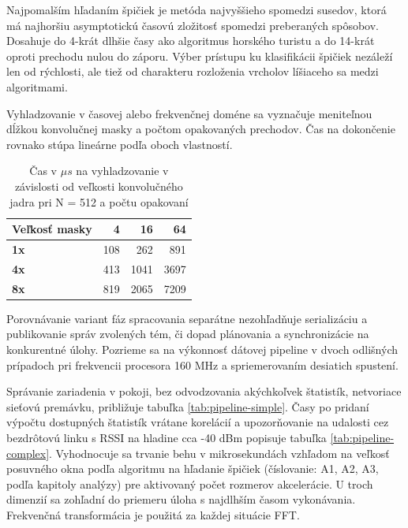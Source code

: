 Najpomalším hľadaním špičiek je metóda najvyššieho spomedzi susedov, ktorá má najhoršiu asymptotickú časovú zložitosť
spomedzi preberaných spôsobov. Dosahuje do 4-krát dlhšie časy ako algoritmus horského turistu a do 14-krát oproti prechodu
nulou do záporu. Výber prístupu ku klasifikácii špičiek nezáleží len od rýchlosti, ale tiež od charakteru rozloženia
vrcholov líšiaceho sa medzi algoritmami.

Vyhladzovanie v časovej alebo frekvenčnej doméne sa vyznačuje meniteľnou dĺžkou konvolučnej masky a počtom opakovaných
prechodov. Čas na dokončenie rovnako stúpa lineárne podľa oboch vlastností.
\begin{table}[h]
\def\arraystretch{1.25}
\centering
\begin{tabular}{|l|r|r|r|}
\hline
\textbf{Veľkosť masky}  & \textbf{4} & \textbf{16} & \textbf{64} \\ \hline
\textbf{1x} & 108        & 262         & 891         \\ \hline
\textbf{4x} & 413        & 1041        & 3697        \\ \hline
\textbf{8x} & 819        & 2065        & 7209        \\ \hline
\end{tabular}
\caption{Čas v $\mu s$ na vyhladzovanie v závislosti od veľkosti konvolučného jadra pri N = 512 a počtu opakovaní}
\label{tab:kernel-execution}
\end{table}

Porovnávanie variant fáz spracovania separátne nezohľadňuje serializáciu a publikovanie správ zvolených tém, či
dopad plánovania a synchronizácie na konkurentné úlohy. Pozrieme sa na výkonnosť dátovej pipeline v dvoch odlišných prípadoch
pri frekvencii procesora 160 MHz a spriemerovaním desiatich spustení.

Správanie zariadenia v pokoji, bez odvodzovania akýchkoľvek štatistík, netvoriace sieťovú premávku, približuje tabuľka
\ref{tab:pipeline-simple}. Časy po pridaní výpočtu dostupných štatistík vrátane korelácií a upozorňovanie na udalosti
cez bezdrôtovú linku s RSSI na hladine cca -40 dBm popisuje tabuľka \ref{tab:pipeline-complex}. Vyhodnocuje sa trvanie behu
v mikrosekundách vzhľadom na veľkosť posuvného okna podľa algoritmu na hľadanie špičiek (číslovanie: A1, A2, A3, podľa kapitoly analýzy)
pre aktivovaný počet rozmerov akcelerácie. U troch dimenzií sa zohľadní do priemeru úloha s najdlhším časom vykonávania.
Frekvenčná transformácia je použitá za každej situácie FFT.

